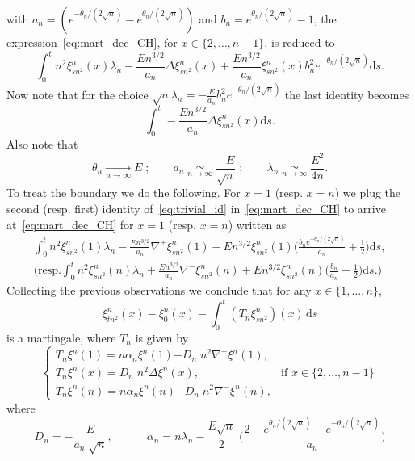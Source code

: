 \documentclass[10pt]{amsart}
\theoremstyle{definition}\newtheorem{defi}[theo]{Definition}\newtheorem{rema}[theo]{Remark}\newtheorem{exam}[theo]{Example}\newtheorem{exem}[theo]{Example}\newtheorem{nota}[theo]{Notation}
\newcommand*{\dd}{\mathrm{d}}
\newcommand*{\ds}{\dd s}
\begin{document}
with $a_n=(e^{-\theta_n/(2\sqrt n)}-e^{\theta_n/(2\sqrt n)})$ and ${b_n=e^{\theta_n/(2\sqrt n)}-1}$, the expression~\eqref{eq:mart_dec_CH}, for $x\in\{2,\dots, n-1\}$, is reduced to
\begin{equation*}
\int_0^t n^2\xi_{{sn^2}}^n(x) \lambda_n- \frac{En^{3/2}}{a_n}\Delta \xi_{{sn^2}}^n(x)+\frac{En^{3/2}}{a_n}\xi_{{sn^2}}^n(x){b_n^2 e^{-\theta_n/(2\sqrt n)}}\ds.
\end{equation*}
Now note that for the choice $\sqrt n \lambda_n=-\frac{E}{a_n}{b_n^2 e^{-\theta_n/(2\sqrt n)}}$ the last identity becomes
\begin{equation*}
\int_0^t -\frac{En^{3/2}}{a_n}\Delta \xi_{{sn^2}}^n(x) \ds.
\end{equation*}
Also note that
\begin{equation}\label{eq:solution}
\theta_n \xrightarrow[n\to\infty]{} E\; ; \quad \quad a_n \underset{n\to\infty}{\simeq} \frac{-E}{\sqrt n}\; ; \quad \quad {\lambda_n\underset{n\to\infty}{\simeq}\frac{E^2}{4n}}.
\end{equation}
To treat the boundary we do the following. For $x=1$ (resp. $x=n$) we plug the second (resp. first) identity of~\eqref{eq:trivial_id} in~\eqref{eq:mart_dec_CH} to arrive at~\eqref{eq:mart_dec_CH} for $x=1$ (resp. $x=n$) written as
\begin{multline}\label{eq:mart_dec_CH_boundary}
\int_0^t n^2\xi_{{sn^2}}^n(1) \lambda_n-\frac{En^{3/2}}{a_n}\nabla^+\xi_{{sn^2}}^n(1)-En^{3/2}\xi_{{sn^2}}^n(1)\bigg(\frac{{b_ne^{-\theta_n/(2\sqrt n)}}}{a_n}+\frac{1}{2}\bigg)\ds, \\
\bigg(\text{resp.} \int_0^t n^2\xi_{{sn^2}}^n({n}) \lambda_n+\frac{En^{3/2}}{a_n}\nabla^-\xi_{sn^2}^n(n)+En^{3/2}\xi_{{sn^2}}^n(n)\bigg(\frac{{b_n}}{a_n}+\frac{1}{2}\bigg) \ds.\bigg)
\end{multline}
Collecting the previous observations we conclude that for any $x\in\{1,\dots,n\}$,
\[
\xi_{{tn^2}}^n(x)-\xi_0^n(x) - \int_0^t (T_n\xi_{{sn^2}}^n)(x) \,\ds
\]
is a martingale, where $T_n$ is given by
\begin{equation}\label{eq:omega}
\begin{cases}
T_n\xi^n(1) =n\alpha_n\xi^n(1){+D_n\; n^2}\nabla^+ \xi^n(1), \\
T_n\xi^n(x) ={D_n\; n^2} \Delta \xi^n(x), &\text{if } x \in\{2,\dots,n-1\} \\
T_n\xi^n(n) = n{\alpha_n} \xi^n(n) {-D_n\; n^2} \nabla^-\xi^n(n),
\end{cases}
\end{equation}
where
\[
D_n = - \frac{E}{a_n \; \sqrt n}, \quad \qquad \alpha_n=n\lambda_n-{\frac{E\sqrt n}{2}\;\bigg(\frac{2-e^{\theta_n/(2\sqrt n)} - e^{-\theta_n/(2\sqrt n)}}{a_n}\bigg)}
\]
\end{document}
